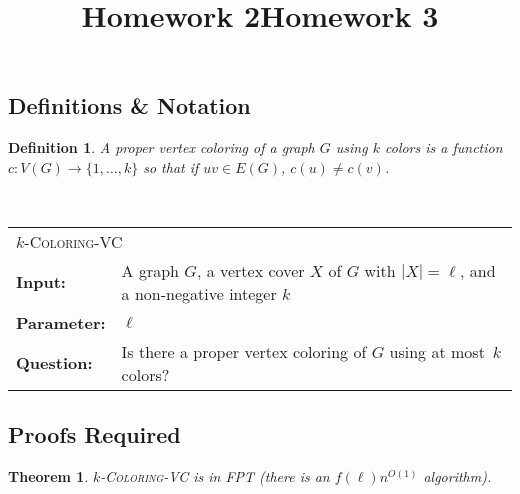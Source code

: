 \documentclass{article}
\title{Homework 2}
\title{Homework 3}
\newcommand{\defproblem}[4]{%
  \hfill\\\smallskip\noindent%
  \begin{tabularx}{\textwidth}{|l X|}%
    \hline%
    \multicolumn{2}{|l|}{\pname{#1}}\\%
    \textbf{Input:}&#2\\%
    \textbf{Parameter:}&#3\\%
    \textbf{Question:}&#4\smallskip\\\hline%
  \end{tabularx}%
  \smallskip%
}%
\newcommand{\pname}[1]{\textnormal{\textsc{#1}}}
\newtheorem*{theorem}{Theorem}
\newtheorem{definition}{Definition}
\begin{document}
\maketitle


\subsection*{Definitions \& Notation}
\begin{definition}
    A \emph{proper vertex coloring} of a graph $G$ \emph{using $k$ colors}
    is a function $c: V(G) \rightarrow \{1,\ldots, k\}$ so that if $uv \in E(G)$,
    $c(u) \neq c(v)$.
\end{definition}


\defproblem{$k$-Coloring-VC}
%
{A graph $G$, a vertex cover $X$ of $G$ with $|X| = \ell$, and a non-negative integer $k$}
%
{$\ell$}
%
{Is there a proper vertex coloring of $G$ using at most~$k$ colors?}
%


\subsection*{Proofs Required}

\begin{theorem} $k$-\pname{Coloring-VC} is in FPT (there is an $f(\ell)n^{O(1)}$ algorithm). 
\end{theorem}
\end{document}
